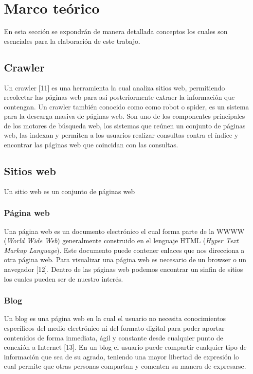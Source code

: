 
\chapter{Marco teórico}

En esta sección se expondrán de manera detallada conceptos los cuales son esenciales para la elaboración de este trabajo.


\section{Crawler}
Un crawler [11] es una herramienta la cual analiza sitios web, permitiendo recolectar las páginas web para así posteriormente extraer la información que contengan. Un crawler también conocido como como robot o spider, es un sistema para la descarga masiva de páginas web. Son uno de los componentes principales de los motores de búsqueda web, los sistemas que reúnen un conjunto de páginas web, las indexan y permiten a los usuarios realizar consultas contra el índice y encontrar las páginas web que coincidan con las consultas.


\section{Sitios web}
Un sitio web es un conjunto de páginas web

\subsection{Página web}
Una página web es un documento electrónico el cual forma parte de la WWWW (\textit{World Wide Web}) generalmente construido en el lenguaje HTML (\textit{Hyper Text Markup Language}). Este documento puede contener enlaces que nos direcciona a otra página web. Para visualizar una página web es necesario de un browser o un navegador [12]. Dentro de las páginas web podemos encontrar un sinfin de sitios los cuales pueden ser de nuestro interés.

\subsection{Blog}
Un blog es una página web en la cual el usuario no necesita conocimientos específicos del medio electrónico ni del formato digital para poder aportar contenidos de forma inmediata, ágil y constante desde cualquier punto de conexión a Internet [13]. En un blog el usuario puede compartir cualquier tipo de información que sea de su agrado, teniendo una mayor libertad de expresión lo cual permite que otras personas compartan y comenten su manera de expresarse.


